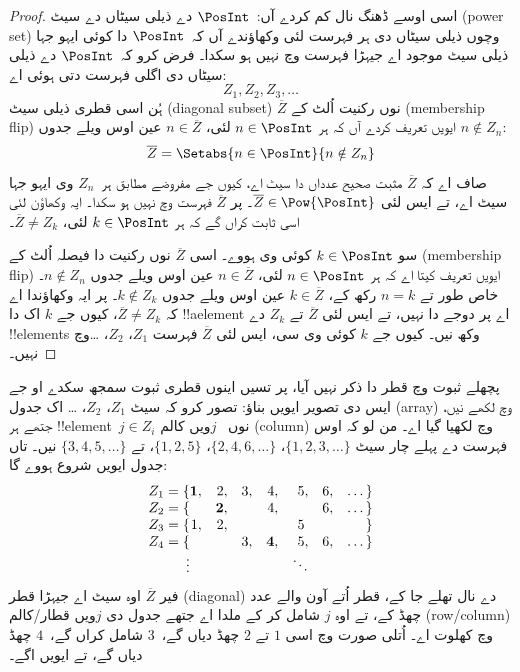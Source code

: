 \documentclass[../../../include/open-logic-section]{subfiles}
\begin{document}
\begin{proof}
اسی اوسے ڈھنگ نال کم کردے آں:~$\PosInt$ دے ذیلی سیٹاں دے سیٹ
(power set) وچوں ذیلی سیٹاں دی ہر
فہرست لئی وکھاؤندے آں کہ~$\PosInt$ دا کوئی ایہو جہا ذیلی سیٹ موجود اے
جیہڑا فہرست وچ نہیں ہو سکدا۔ فرض کرو کہ~$\PosInt$ دے ذیلی سیٹاں دی
اگلی فہرست دتی ہوئی اے:
\[
Z_{1}, Z_{2}, Z_{3}, \dots
\]
ہُن اسی قطری ذیلی سیٹ (diagonal subset) $\overline{Z}$ نوں رکنیت اُلٹ
کے (membership flip) ایویں تعریف کردے آں کہ ہر
$n \in \PosInt$ لئی، $n \in \overline{Z}$ عین اوس ویلے جدوں
$n \notin Z_{n}$:
\[
\overline{Z} = \Setabs{n \in \PosInt}{n \notin Z_n}
\]
صاف اے کہ $\overline{Z}$ مثبت صحیح عدداں دا سیٹ اے، کیوں جے مفروضے
مطابق ہر~$Z_n$ وی ایہو جہا سیٹ اے، تے ایس لئی
$\overline{Z} \in \Pow{\PosInt}$۔ پر $\overline{Z}$ فہرست وچ نہیں
ہو سکدا۔ ایہ وکھاؤن لئی اسی ثابت کراں گے کہ ہر
$k \in \PosInt$ لئی، $\overline{Z} \neq Z_k$۔

سو $k \in \PosInt$ کوئی وی ہووے۔ اسی $\overline{Z}$ نوں رکنیت دا
فیصلہ اُلٹ کے (membership flip) ایویں تعریف
کیتا اے کہ ہر $n \in \PosInt$ لئی، $n \in \overline{Z}$ عین اوس
ویلے جدوں $n \notin Z_n$۔ خاص طور تے $n=k$ رکھ کے،
$k \in \overline{Z}$ عین اوس ویلے جدوں $k \notin Z_k$۔ پر ایہ
وکھاؤندا اے کہ $\overline{Z} \neq Z_k$، کیوں جے $k$ اک دا
!!a{element} اے پر دوجے دا نہیں، تے ایس لئی $\overline{Z}$ تے $Z_k$
دے !!{element}s وکھ نیں۔ کیوں جے $k$ کوئی وی سی، ایس لئی
$\overline{Z}$ فہرست $Z_1$، $Z_2$، \dots وچ نہیں۔
\end{proof}

\begin{explain}
پچھلے ثبوت وچ قطر دا ذکر نہیں آیا، پر تسیں اینوں قطری ثبوت سمجھ سکدے
او جے ایس دی تصویر ایویں بناؤ: تصور کرو کہ سیٹ $Z_1$، $Z_2$، \dots
اک جدول (array) وچ لکھے نیں، جتھے ہر !!{element}~$j \in Z_i$ نوں
~$j$ویں کالم (column)
وچ لکھیا گیا اے۔ من لو کہ اوس فہرست دے پہلے چار سیٹ
$\{1,2,3,\dots\}$، $\{2, 4, 6, \dots\}$، $\{1,2,5\}$، تے
$\{3,4,5,\dots\}$ نیں۔ تاں جدول ایویں شروع ہووے گا:
\[
\begin{array}{r@{}rrrrrrr}
  Z_1 = \{ & \mathbf{1}, & 2, & 3, & 4, & 5, & 6, & \dots\}\\
  Z_2 = \{ &  & \mathbf{2}, &  & 4, &  & 6, & \dots\}\\
  Z_3 = \{ & 1, & 2, &  &  & 5\phantom{,} &  & \}\\
  Z_4 = \{ &  &  & 3, & \mathbf{4}, & 5, & 6, & \dots\}\\
  \vdots & & & & & \ddots
\end{array}
\]
فیر $\overline{Z}$ اوہ سیٹ اے جیہڑا قطر (diagonal) دے نال تھلے جا کے، قطر اُتے
آون والے عدد چھڈ کے، تے اوہ $j$ شامل کر کے ملدا اے جتھے جدول دی
$j$ویں قطار/کالم (row/column) وچ کھلوت اے۔ اُتلی صورت وچ اسی $1$ تے $2$ چھڈ
دیاں گے،~$3$ شامل کراں گے،~$4$ چھڈ دیاں گے، تے ایویں اگے۔
\end{explain}
\end{document}
